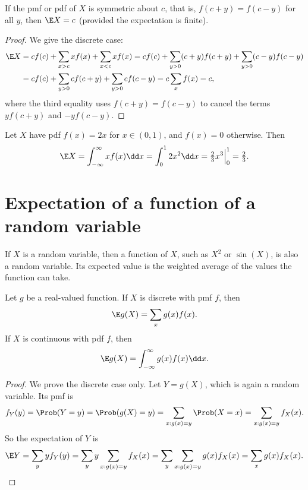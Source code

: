 \begin{proposition}\label{prop:symmetric-expectation}
If the pmf or pdf of $X$ is symmetric about $c$, that is, $f(c + y) = f(c - y)$ for all $y$, then $\E X = c$ (provided the expectation is finite).
\end{proposition}

\begin{proof}
We give the discrete case:
\begin{align*}
  \E X &= c f(c) + \sum_{x > c} x f(x) + \sum_{x < c} x f(x)
        = c f(c) + \sum_{y > 0} (c + y) f(c + y) + \sum_{y > 0} (c - y) f(c - y) \\
       &= c f(c) + \sum_{y > 0} c f(c + y) + \sum_{y > 0} c f(c - y)
        = c \sum_x f(x) = c,
\end{align*}
where the third equality uses $f(c+y) = f(c-y)$ to cancel the terms $y f(c+y)$ and $-y f(c-y)$.
\end{proof}

\begin{example}\label{ex:expectation-2x}
Let $X$ have pdf $f(x) = 2x$ for $x \in (0, 1)$, and $f(x) = 0$ otherwise. Then
\[
  \E X = \int_{-\infty}^{\infty} x f(x) \dd x = \int_0^1 2x^2 \dd x = \tfrac23 x^3 \Big|_0^1 = \tfrac23.
\]
\end{example}

\section{Expectation of a function of a random variable}\label{sec:expectation-of-function}

If $X$ is a random variable, then a function of $X$, such as $X^2$ or $\sin(X)$, is also a random variable. Its expected value is the weighted average of the values the function can take.

\begin{theorem}\label{thm:lotus}
Let $g$ be a real-valued function. If $X$ is discrete with pmf $f$, then
\[
  \E g(X) = \sum_x g(x) f(x).
\]
If $X$ is continuous with pdf $f$, then
\[
  \E g(X) = \int_{-\infty}^{\infty} g(x) f(x) \dd x.
\]
\end{theorem}

\begin{proof}
We prove the discrete case only. Let $Y = g(X)$, which is again a random variable. Its pmf is
\[
  f_Y(y) = \Prob(Y = y) = \Prob(g(X) = y) = \sum_{x : g(x) = y} \Prob(X = x) = \sum_{x : g(x) = y} f_X(x).
\]
So the expectation of $Y$ is
\[
  \E Y = \sum_y y f_Y(y) = \sum_y y \sum_{x : g(x) = y} f_X(x) = \sum_y \sum_{x : g(x) = y} g(x) f_X(x) = \sum_x g(x) f_X(x). \qedhere
\]
\end{proof}

